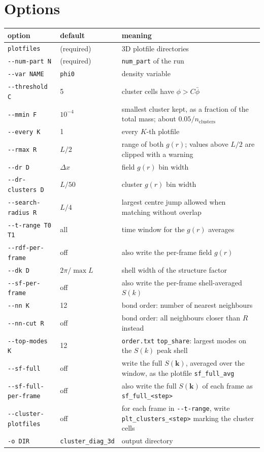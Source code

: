 \documentclass[11pt]{article}
\newcommand{\code}[1]{\texttt{#1}}
\begin{document}
\section{Options}
\begin{center}
\begin{tabularx}{\textwidth}{@{}l l L@{}}
\toprule
option & default & meaning \\
\midrule
\code{plotfiles} & (required) & 3D plotfile directories \\
\code{-{}-num-part N} & (required) & \code{num\_part} of the run \\
\code{-{}-var NAME} & \code{phi0} & density variable \\
\code{-{}-threshold C} & 5 & cluster cells have $\phi>C\bar\phi$ \\
\code{-{}-mmin F} & $10^{-4}$ & smallest cluster kept, as a fraction of the total mass; about $0.05/n_{\mathrm{clusters}}$ \\
\code{-{}-every K} & 1 & every $K$-th plotfile \\
\code{-{}-rmax R} & $L/2$ & range of both $g(r)$; values above $L/2$ are clipped with a warning \\
\code{-{}-dr D} & $\Delta x$ & field $g(r)$ bin width \\
\code{-{}-dr-clusters D} & $L/50$ & cluster $g(r)$ bin width \\
\code{-{}-search-radius R} & $L/4$ & largest centre jump allowed when matching without overlap \\
\code{-{}-t-range T0 T1} & all & time window for the $g(r)$ averages \\
\code{-{}-rdf-per-frame} & off & also write the per-frame field $g(r)$ \\
\code{-{}-dk D} & $2\pi/\max L$ & shell width of the structure factor \\
\code{-{}-sf-per-frame} & off & also write the per-frame shell-averaged $S(k)$ \\
\code{-{}-nn K} & 12 & bond order: number of nearest neighbours \\
\code{-{}-nn-cut R} & off & bond order: all neighbours closer than $R$ instead \\
\code{-{}-top-modes K} & 12 & \code{order.txt} \code{top\_share}: largest modes on the $S(k)$ peak shell \\
\code{-{}-sf-full} & off & write the full $S(\mathbf k)$, averaged over the window, as the plotfile \code{sf\_full\_avg} \\
\code{-{}-sf-full-per-frame} & off & also write the full $S(\mathbf k)$ of each frame as \code{sf\_full\_<step>} \\
\code{-{}-cluster-plotfiles} & off & for each frame in \code{-{}-t-range}, write \code{plt\_clusters\_<step>} marking the cluster cells \\
\code{-o DIR} & \code{cluster\_diag\_3d} & output directory \\
\bottomrule
\end{tabularx}
\end{center}
\end{document}
